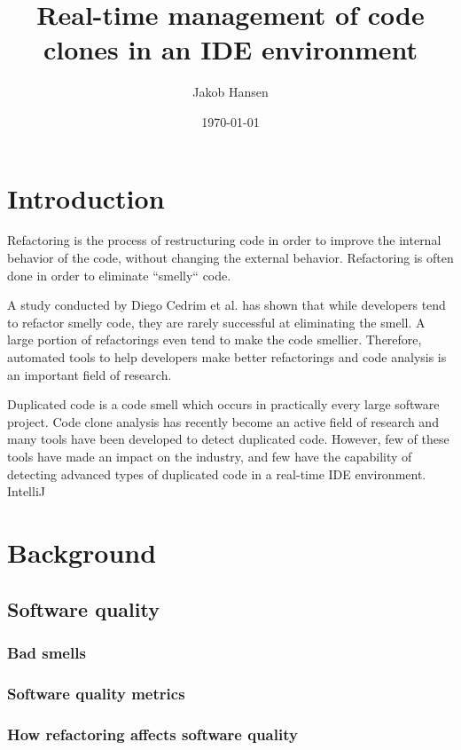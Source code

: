 \documentclass[12pt]{article}
\title{Real-time management of code clones in an IDE environment}
\author{Jakob Hansen}
\date{\today}
\begin{document}
\maketitle

\tableofcontents

\section{Introduction}

Refactoring is the process of restructuring code in order to improve the internal behavior
of the code, without changing the external behavior.\cite{fowlerrefactoring} Refactoring
is often done in order to eliminate ``smelly`` code.

A study conducted by Diego Cedrim et al.\cite{Rohit_Gheyi_Impact} has shown that
while developers tend to refactor smelly code, they are rarely successful at eliminating
the smell. A large portion of refactorings even tend to make the code smellier. Therefore,
automated tools to help developers make better refactorings and code analysis is an
important field of research.

Duplicated code is a code smell which occurs in practically every large software project.
Code clone analysis has recently become an active field of research and many tools have
been developed to detect duplicated code.\cite{Inoue_introduction_to_cc} However, few of
these tools have made an impact on the industry, and few have the capability of detecting
advanced types of duplicated code in a real-time IDE environment. IntelliJ 

\section{Background}

\subsection{Software quality}

\subsubsection{Bad smells}

\subsubsection{Software quality metrics}

\subsubsection{How refactoring affects software quality}
\end{document}
